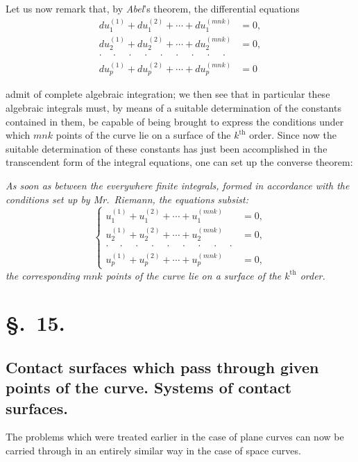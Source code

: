 \documentclass{article}
\begin{document}
Let us now remark that, by \emph{Abel}'s theorem, the differential equations
\[
\begin{aligned}
du_{1}^{(1)}+du_{1}^{(2)}+\cdots+du_{1}^{(mnk)} &= 0,\\
du_{2}^{(1)}+du_{2}^{(2)}+\cdots+du_{2}^{(mnk)} &= 0,\\
\cdot\quad\cdot\quad\cdot\quad\cdot\quad\cdot\quad\cdot\quad\cdot\quad\cdot\quad\cdot &\\
du_{p}^{(1)}+du_{p}^{(2)}+\cdots+du_{p}^{(mnk)} &= 0
\end{aligned}
\]

admit of complete algebraic integration; we then see that in particular these algebraic integrals must, by means of a suitable determination of the constants contained in them, be capable of being brought to express the conditions under which $mnk$ points of the curve lie on a surface of the $k^{\text{th}}$ order. Since now the suitable determination of these constants has just been accomplished in the transcendent form of the integral equations, one can set up the converse theorem:

\emph{As soon as between the everywhere finite integrals, formed in accordance with the conditions set up by Mr.\ Riemann, the equations subsist:}
\[
\left\{
\begin{aligned}
u_{1}^{(1)}+u_{1}^{(2)}+\cdots+u_{1}^{(mnk)} &= 0,\\
u_{2}^{(1)}+u_{2}^{(2)}+\cdots+u_{2}^{(mnk)} &= 0,\\
\cdot\quad\cdot\quad\cdot\quad\cdot\quad\cdot\quad\cdot\quad\cdot\quad\cdot\quad\cdot &\\
u_{p}^{(1)}+u_{p}^{(2)}+\cdots+u_{p}^{(mnk)} &= 0,
\end{aligned}
\right.\tag{24.}
\]
\emph{the corresponding $mnk$ points of the curve lie on a surface of the $k^{\text{th}}$ order.}

\section*{§.~15.}

\subsection*{Contact surfaces which pass through given points of the curve. Systems of contact surfaces.}

The problems which were treated earlier in the case of plane curves can now be carried through in an entirely similar way in the case of space curves.
\end{document}
